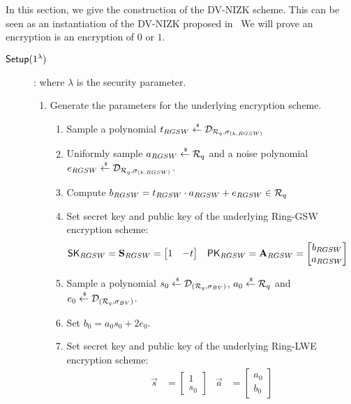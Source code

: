 In this section, we give the construction of the DV-NIZK scheme.
This can be seen as an instantiation of the DV-NIZK proposed in~\cite{DBLP:conf/pkc/ChaidosG15}
We will prove an encryption is an encryption of $0$ or $1$.

\begin{description}
\item[${\mathsf{Setup}}(1^\lambda)$]: where $\lambda$ is the security parameter.
  \begin{enumerate}
    \item Generate the parameters for the underlying encryption scheme.
      \begin{enumerate}
      \item Sample a polynomial $t_{RGSW} \stackrel{{\scriptscriptstyle \mkern4mu \$}}{\gets} \mathcal{D}_{{\mathcal{R}}_q, \sigma_{(k,RGSW)}}$
      \item Uniformly sample $a_{RGSW} \stackrel{{\scriptscriptstyle \mkern4mu \$}}{\gets} {\mathcal{R}}_q$ and a noise polynomial $e_{RGSW} \stackrel{{\scriptscriptstyle \mkern4mu \$}}{\gets} \mathcal{D}_{{\mathcal{R}}_q, \sigma_{(k, RGSW)}}$.
      \item Compute $b_{RGSW} = t_{RGSW} \cdot a_{RGSW} + e_{RGSW} \in {\mathcal{R}}_q$
      \item Set secret key and public key of the underlying Ring-GSW encryption scheme:
        \begin{align*}
          \mathsf{SK}_{RGSW} &= \mathbf{S}_{RGSW} =\begin{bmatrix} 1 & -t \end{bmatrix}  & \mathsf{PK}_{RGSW} &= \mathbf{A}_{RGSW} =  \begin{bmatrix} b_{RGSW} \\ a_{RGSW}\end{bmatrix}
        \end{align*}
      \item Sample a polynomial $s_0 \stackrel{{\scriptscriptstyle \mkern4mu \$}}{\gets} \mathcal{D}_{({\mathcal{R}}_q, \sigma_{BV})}$, $a_0 \stackrel{{\scriptscriptstyle \mkern4mu \$}}{\gets} {\mathcal{R}}_q$ and $e_0 \stackrel{{\scriptscriptstyle \mkern4mu \$}}{\gets} \mathcal{D}_{({\mathcal{R}}_q, \sigma_{BV})}$.
      \item Set $b_0 = a_0 s_0 + 2 e_0$.
      \item Set secret key and public key of the underlying Ring-LWE encryption scheme:
        \begin{align*}
          \vec{s} &= \begin{bmatrix} 1 \\ s_0\end{bmatrix} & \vec{a} &= \begin{bmatrix} a_0 \\ b_0\end{bmatrix}

\end{align*}
\end{enumerate}
\end{enumerate}
\end{description}
